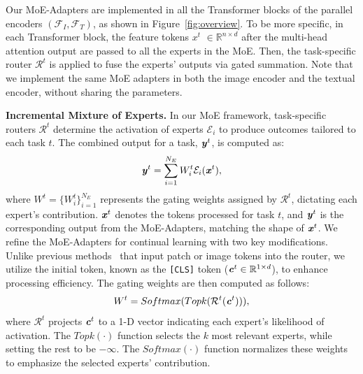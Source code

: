 Our MoE-Adapters are implemented in all the Transformer blocks of the parallel encoders $(\mathcal{F}_I,\mathcal{F}_T)$, as shown in Figure~\ref{fig:overview}. 
To be more specific, in each Transformer block, the feature tokens \textbf{\textit{$x^t$}} $\in \mathbb{R}^{n\times d}$ after the multi-head attention output are passed to all the experts in the MoE. 
Then, the task-specific router $\mathcal{R}^t$ is applied to fuse the experts' outputs via gated summation. Note that we implement the same MoE adapters in both the image  encoder and the textual encoder, without sharing the parameters. 
 
%



\vspace{1ex}
\noindent\textbf{Incremental Mixture of Experts.} 
%
In our MoE framework, task-specific routers $\mathcal{R}^t$ determine the activation of experts $\mathcal{E}_i$ to produce outcomes tailored to each task $t$. The combined output for a task, $\textbf{\textit{y}}^t$, is computed as:
\begin{equation}
    \textbf{\textit{y}}^t = \sum_{i=1}^{N_E}{W_i^t}\mathcal{E}_i(\textbf{\textit{x}}^t),
\end{equation}
where $W^t=\{W_i^t\}_{i=1}^{N_E}$ represents the gating weights assigned by $\mathcal{R}^t$, dictating each expert's contribution. $\textbf{\textit{x}}^t$ denotes the tokens processed for task $t$, and $\textbf{\textit{y}}^t$ is the corresponding output from the MoE-Adapters, matching the shape of $\textbf{\textit{x}}^t$.
%
We refine the MoE-Adapters for continual learning with two key modifications. Unlike previous methods~\cite{riquelme2021scaling, daxberger2023mobile} that input patch or image tokens into the router, we utilize the initial token, known as the \texttt{[CLS]} token ($\textbf{\textit{c}}^t \in \mathbb{R}^{1\times d}$), to enhance processing efficiency. The gating weights are then computed as follows:
\begin{equation}
\label{eq:gate1}
W^t = Softmax(Topk(\mathcal{R}^t(\textbf{\textit{c}}^t))),
\end{equation}
where $\mathcal{R}^t$ projects $\textbf{\textit{c}}^t$ to a 1-D vector indicating each expert's likelihood of activation. The $Topk(\cdot)$ function selects the $k$ most relevant experts, while setting the rest to be $-\infty$. The $Softmax(\cdot)$ function normalizes these weights to emphasize the selected experts' contribution.

